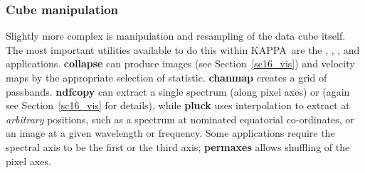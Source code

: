 \documentclass[twoside,11pt]{starlink}
\providecommand{\KAPPA}{{\footnotesize KAPPA}\normalsize}
\begin{document}
\subsubsection{Cube manipulation}

Slightly more complex is manipulation and resampling of the data cube
itself.  The most important utilities available to do this within
\KAPPA\ are the ,
, ,
and  applications.  \textbf{collapse} can
produce  images (see
Section~\ref{sc16_vis}) and velocity maps by the appropriate
selection of statistic.  \textbf{chanmap} creates a grid of passbands.
\textbf{ndfcopy} can extract a single spectrum (along pixel axes) or
 (again see
Section~\ref{sc16_vis} for details), while \textbf{pluck} uses
interpolation to extract at \emph{arbitrary} positions, such as a
spectrum at nominated equatorial co-ordinates, or an image at a given
wavelength or frequency.  Some applications require the spectral
axis to be the first or the third axis; \textbf{permaxes} allows
shuffling of the pixel axes.
\end{document}

